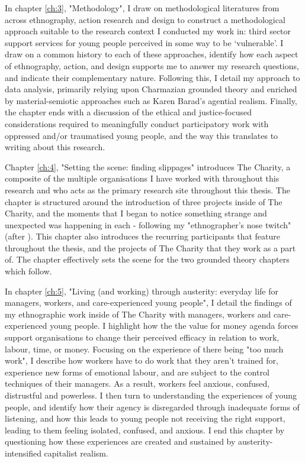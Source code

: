 In chapter \ref{ch:3}, "Methodology", I draw on methodological literatures from across ethnography, action research and design to construct a methodological approach suitable to the research context I conducted my work in: third sector support services for young people perceived in some way to be `vulnerable'. I draw on a common history to each of these approaches, identify how each aspect of ethnography, action, and design supports me to answer my research questions, and indicate their complementary nature. Following this, I detail my approach to data analysis, primarily relying upon Charmazian grounded theory and enriched by material-semiotic approaches such as Karen Barad's agential realism. Finally, the chapter ends with a discussion of the ethical and justice-focused considerations required to meaningfully conduct participatory work with oppressed and/or traumatised young people, and the way this translates to writing about this research. 

Chapter \ref{ch:4}, "Setting the scene: finding slippages" introduces The Charity, a composite of the multiple organisations I have worked with throughout this research and who acts as the primary research site throughout this thesis. The chapter is structured around the introduction of three projects inside of The Charity, and the moments that I began to notice something strange and unexpected was happening in each - following my "ethnographer's nose twitch" (after \citet{star_ethnography_1999}). This chapter also introduces the recurring participants that feature throughout the thesis, and the projects of The Charity that they work as a part of. The chapter effectively sets the scene for the two grounded theory chapters which follow.

In chapter \ref{ch:5}, "Living (and working) through austerity: everyday life for managers, workers, and care-experienced young people", I detail the findings of my ethnographic work inside of The Charity with managers, workers and care-experienced young people. I highlight how the the value for money agenda forces support organisations to change their perceived efficacy in relation to work, labour, time, or money. Focusing on the experience of there being "too much work", I describe how workers have to do work that they aren't trained for, experience new forms of emotional labour, and are subject to the control techniques of their managers. As a result, workers feel anxious, confused, distrustful and powerless.  I then turn to understanding the experiences of young people, and identify how their agency is disregarded through inadequate forms of listening, and how this leads to young people not receiving the right support, leading to them feeling isolated, confused, and anxious. I end this chapter by questioning how these experiences are created and sustained by austerity-intensified capitalist realism.

